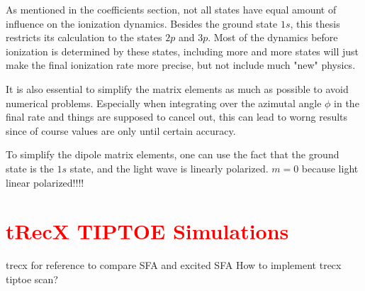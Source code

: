 As mentioned in the coefficients section, not all states have equal amount of influence on the ionization dynamics.
Besides the ground state $1s$, this thesis restricts its calculation to the states $2p$ and $3p$.
Most of the dynamics before ionization is determined by these states, including more and more states will just make the final ionization rate more precise, but not include much "new" physics.

It is also essential to simplify the matrix elements as much as possible to avoid numerical problems.
Especially when integrating over the azimutal angle $\phi$ in the final rate and things are supposed to cancel out, this can lead to worng results since of course values are only until certain accuracy.

To simplify the dipole matrix elements, one can use the fact that the ground state is the $1s$ state, and the light wave is linearly polarized.
$m=0$ because light linear polarized!!!!



\section{\textcolor{red}{tRecX TIPTOE Simulations}}
trecx for reference to compare SFA and excited SFA
How to implement trecx tiptoe scan?

